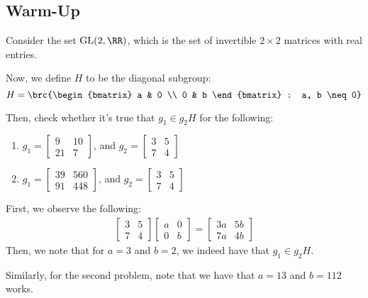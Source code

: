 \documentclass[openany]{book}
\begin{document}
\subsection{Warm-Up}
\begin{hw}
	Consider the set $\mathrm{GL}(2, \RR)$, which is the set of invertible $2\times2$ matrices with real entries.
	
	Now, we define $H$ to be the diagonal subgroup:
	\begin{equation*}
		H = \brc{\begin{bmatrix}
				a & 0 \\ 0 & b
		\end{bmatrix} : a, b \neq 0}
	\end{equation*}

	Then, check whether it's true that $g_1 \in g_2H$ for the following:
	\begin{enumerate}
		\item $g_1 = \begin{bmatrix}
			9 & 10 \\ 21 & 7
		\end{bmatrix}$, and $g_2 = \begin{bmatrix}
		3 & 5 \\ 7 & 4
	\end{bmatrix}$
		\item $g_1 = \begin{bmatrix}
			39 & 560 \\ 91 & 448
		\end{bmatrix}$, and $g_2 = \begin{bmatrix}
		3 & 5 \\ 7 & 4
	\end{bmatrix}$
	\end{enumerate}
\end{hw}
\begin{solution}
	First, we observe the following:
	\begin{align*}
		\begin{bmatrix}
			3 & 5 \\ 7 & 4
		\end{bmatrix}
		\begin{bmatrix}
			a & 0 \\ 0 & b
		\end{bmatrix}
		 =
		 \begin{bmatrix}
		 	3a & 5b \\ 7a & 4b
		 \end{bmatrix}
	\end{align*}
	Then, we note that for $a = 3$ and $b = 2$, we indeed have that $g_1 \in g_2H$.
	
	Similarly, for the second problem, note that we have that $a = 13$ and $b = 112$ works.
\end{solution}
\end{document}
